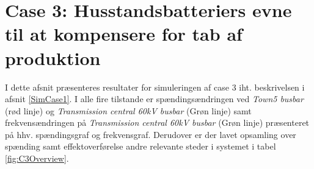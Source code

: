 
\section{Case 3: Husstandsbatteriers evne til at kompensere for tab af produktion}
I dette afsnit præsenteres resultater for simuleringen af case 3 iht. beskrivelsen i afsnit \ref{SimCase1}. I alle fire tilstande er spændingsændringen ved \textit{Town5 busbar} (rød linje) og \textit{Transmission central 60kV busbar} (Grøn linje) samt frekvensændringen på \textit{Transmission central 60kV busbar} (Grøn linje) præsenteret på hhv. spændingsgraf og frekvensgraf. Derudover er der lavet opsamling over spænding samt effektoverførelse andre relevante steder i systemet i tabel \ref{fig:C3Overview}. \\ \\

